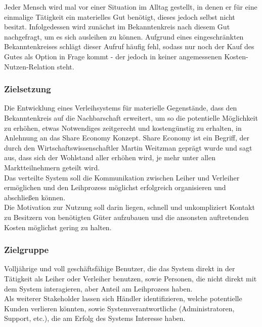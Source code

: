 
Jeder Mensch wird mal vor einer Situation im Alltag gestellt, in denen er für eine einmalige Tätigkeit ein materielles Gut benötigt, dieses jedoch selbst nicht besitzt. Infolgedessen wird zunächst im Bekanntenkreis nach diesem Gut nachgefragt, um es sich ausleihen zu können.
Aufgrund eines eingeschränkten Bekanntenkreises schlägt dieser Aufruf häufig fehl, sodass nur noch der Kauf des Gutes als Option in Frage kommt - der jedoch in keiner angemessenen Kosten-Nutzen-Relation steht.


\subsubsection{Zielsetzung}
Die Entwicklung eines Verleihsystems für materielle Gegenstände, dass den Bekanntenkreis auf die Nachbarschaft erweitert, um so die potentielle Möglichkeit zu erhöhen, etwas Notwendiges zeitgerecht und kostengünstig zu erhalten, in Anlehnung an das Share Economy Konzept.
Share Economy ist ein Begriff, der durch den Wirtschaftswissenschaftler Martin Weitzman geprägt wurde und sagt aus, dass sich der Wohlstand aller erhöhen wird, je mehr unter allen Marktteilnehmern geteilt wird.\\
Das verteilte System soll die Kommunikation zwischen Leiher und Verleiher ermöglichen und den Leihprozess möglichst erfolgreich organisieren und abschließen können.\\
Die Motivation zur Nutzung soll darin liegen, schnell und unkompliziert Kontakt zu Besitzern von benötigten Güter aufzubauen und die ansonsten auftretenden Kosten möglichst gering zu halten.


\subsubsection{Zielgruppe}
Volljährige und voll geschäftsfähige Benutzer, die das System direkt in der Tätigkeit als Leiher oder Verleiher benutzen, sowie Personen, die nicht direkt mit dem System interagieren, aber Anteil am Leihprozess haben.\\
Als weiterer Stakeholder lassen sich Händler identifizieren, welche potentielle Kunden verlieren könnten, sowie Systemverantwortliche (Administratoren, Support, etc.), die am Erfolg des Systems Interesse haben.


